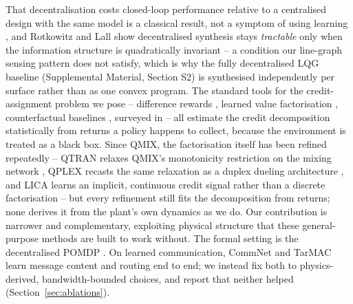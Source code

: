 \documentclass[preprint,11pt]{elsarticle}
\begin{document}
That decentralisation costs closed-loop performance relative to a
centralised design with the same model is a classical result, not a
symptom of using learning \cite{siljak1991decentralized,
bakule2008decentralized}, and Rotkowitz and Lall
\cite{rotkowitz2006characterization} show decentralised synthesis stays
\emph{tractable} only when the information structure is quadratically
invariant -- a condition our line-graph sensing pattern does not satisfy,
which is why the fully decentralised LQG baseline (Supplemental Material,
Section S2) is synthesised independently per surface rather than as one
convex program. The standard tools for the credit-assignment problem we
pose -- difference rewards \cite{wolpert2002difference}, learned value
factorisation \cite{sunehag2018vdn,rashid2018qmix}, counterfactual baselines
\cite{foerster2018coma}, surveyed in
\cite{albrecht2023survey,scalingmarl2025,multilevelcredit2025} -- all
estimate the credit decomposition statistically from returns a policy
happens to collect, because the environment is treated as a black box.
Since QMIX, the factorisation itself has been refined repeatedly --
QTRAN relaxes QMIX's monotonicity restriction on the mixing network
\cite{son2019qtran}, QPLEX recasts the same relaxation as a duplex
dueling architecture \cite{wang2021qplex}, and LICA learns an implicit,
continuous credit signal rather than a discrete factorisation
\cite{zhou2020lica} -- but every refinement still fits the decomposition
from returns; none derives it from the plant's own dynamics as we do. Our
contribution is narrower and complementary, exploiting physical structure
that these general-purpose methods are built to work without. The formal
setting is the decentralised POMDP
\cite{bernstein2002complexity,oliehoek2016concise}. On learned
communication, CommNet \cite{sukhbaatar2016commnet} and TarMAC
\cite{das2019tarmac} learn message content and routing end to end; we
instead fix both to physics-derived, bandwidth-bounded choices, and report
that neither helped (Section~\ref{sec:ablations}).
\end{document}
